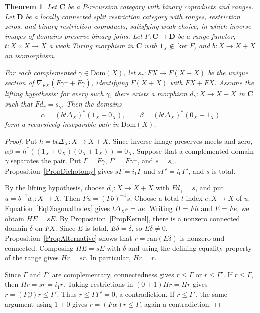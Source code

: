 \documentclass[letterpaper,10pt]{amsart}
\theoremstyle{plain}
\newtheorem{thm}{Theorem}[section]
\theoremstyle{definition}
\newcommand{\rst}[1]{\overline{#1}}
\begin{document}
\begin{thm}\label{ThmRecIns}
Let $\mathbf C$ be a $P$-recursion category with binary coproducts and
ranges. Let $\mathbf D$ be a locally connected split restriction category
with ranges, restriction zeros, and binary restriction coproducts,
satisfying weak choice, in which inverse images of domains preserve
binary joins. Let $F:\mathbf C\to\mathbf D$ be a range functor,
$t:X\times X\to X$ a weak Turing morphism in $\mathbf C$ with
$1_X\notin\ker F$, and $b:X\to X+X$ an isomorphism.

For each complemented $\gamma\in\mathrm{Dom}(X)$, let
$s_\gamma:FX\to F(X+X)$ be the unique section of
$\nabla_{FX}(F\gamma^\perp+F\gamma)$, identifying $F(X+X)$ with
$FX+FX$. Assume the \textit{lifting hypothesis}: for every such
$\gamma$, there exists a morphism $d_\gamma:X\to X+X$ in
$\mathbf C$ such that $Fd_\gamma=s_\gamma$. Then the domains
\[
\alpha=(bt\Delta_X)^*(1_X+0_X),\qquad
\beta=(bt\Delta_X)^*(0_X+1_X)
\]
form a recursively inseparable pair in $\mathrm{Dom}(X)$.
\end{thm}
\begin{proof}
Put $h=bt\Delta_X:X\to X+X$. Since inverse image preserves meets
and zero, $\alpha\beta=h^*((1_X+0_X)(0_X+1_X))=0_X$.
Suppose that a complemented domain $\gamma$ separates the pair. Put
$\Gamma=F\gamma$, $\Gamma'=F\gamma^\perp$, and $s=s_\gamma$.
Proposition~\ref{PropDichotomy} gives
$s\Gamma=i_1\Gamma$ and $s\Gamma'=i_0\Gamma'$, and $s$ is total.

By the lifting hypothesis, choose $d_\gamma:X\to X+X$ with
$Fd_\gamma=s$, and put $u=b^{-1}d_\gamma:X\to X$.
Then $Fu=(Fb)^{-1}s$. Choose a total $t$-index $e:X\to X$ of $u$.
Equation~\eqref{EqDiagonalIndex} gives $t\Delta_Xe=ue$.
Writing $H=Fh$ and $E=Fe$, we obtain $HE=sE$.
By Proposition~\ref{PropKernel}, there is a nonzero connected domain
$\delta$ on $FX$. Since $E$ is total, $\rst{E\delta}=\delta$,
so $E\delta\ne0$. Proposition~\ref{PropAlternative} shows that
$r=\mathrm{ran}(E\delta)$ is nonzero and connected.
Composing $HE=sE$ with $\delta$ and using the defining equality
property of the range gives $Hr=sr$. In particular, $\rst{Hr}=r$.

Since $\Gamma$ and $\Gamma'$ are complementary, connectedness gives
$r\le\Gamma$ or $r\le\Gamma'$. If $r\le\Gamma$, then
$Hr=sr=i_1r$. Taking restrictions in $(0+1)Hr=Hr$ gives
$r=(F\beta)r\le\Gamma'$. Thus $r\le\Gamma\Gamma'=0$, a
contradiction. If $r\le\Gamma'$, the same argument using $1+0$
gives $r=(F\alpha)r\le\Gamma$, again a contradiction.
\end{proof}
\end{document}
